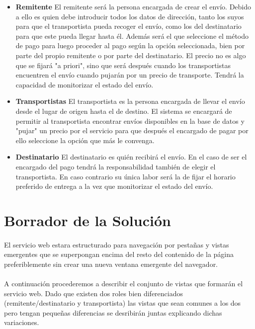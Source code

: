 \documentclass[10pt, a4paper,spanish]{article}
\begin{document}
			\begin{itemize}

				\item{\textbf{Remitente}}
				\newline
				El remitente será la persona encargada de crear el envío. Debido a ello es quien debe introducir todos los datos de dirección, tanto los suyos para que el transportista pueda recoger el envío, como los del destinatario para que este pueda llegar hasta él. Además será el que seleccione el método de pago para luego proceder al pago según la opción seleccionada, bien por parte del propio remitente o por parte del destinatario. El precio no es algo que se fijará "a priori", sino que será después cuando los transportistas encuentren el envío cuando pujarán por un precio de transporte. Tendrá la capacidad de monitorizar el estado del envío.

				\item{\textbf{Transportistas}}
				\newline
				El transportista es la persona encargada de llevar el envío desde el lugar de origen hasta el de destino. El sistema se encargará de permitir al transportista encontrar envíos disponibles en la base de datos y "pujar" un precio por el servicio para que después el encargado de pagar por ello seleccione la opción que más le convenga.

				\item{\textbf{Destinatario}}
				\newline
				El destinatario es quién recibirá el envío. En el caso de ser el encargado del pago tendrá la responsabilidad también de elegir el transportista. En caso contrario su única labor será la de fijar el horario preferido de entrega a la vez que monitorizar el estado del envío.

			\end{itemize}
		\section{Borrador de la Solución}

			\paragraph{}
			El servicio web estara estructurado para navegación por pestañas y vistas emergentes que se superpongan encima del resto del contenido de la página preferiblemente sin crear una nueva ventana emergente del navegador.

			\paragraph{}
			A continuación procederemos a describir el conjunto de vistas que formarán el servicio web. Dado que existen dos roles bien diferenciados (remitente/destinatario y transportista) las vistas que sean comunes a los dos pero tengan pequeñas diferencias se desribirán juntas explicando dichas variaciones.
\end{document}
